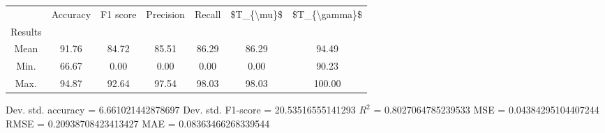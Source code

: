 \begin{tabular}{|c|c|c|c|c|c|c|}
\toprule
{} &  Accuracy &  F1 score &  Precision &  Recall &  \$T\_\{\textbackslash mu\}\$ &  \$T\_\{\textbackslash gamma\}\$ \\
Results &           &           &            &         &            &               \\
\hline
Mean    &     91.76 &     84.72 &      85.51 &   86.29 &      86.29 &         94.49 \\
Min.    &     66.67 &      0.00 &       0.00 &    0.00 &       0.00 &         90.23 \\
Max.    &     94.87 &     92.64 &      97.54 &   98.03 &      98.03 &        100.00 \\
\bottomrule
\end{tabular}

 Dev. std. accuracy = 6.661021442878697
 Dev. std. F1-score = 20.53516555141293
 $R^2$ = 0.8027064785239533
 MSE = 0.04384295104407244
 RMSE = 0.20938708423413427
 MAE = 0.08363466268339544
